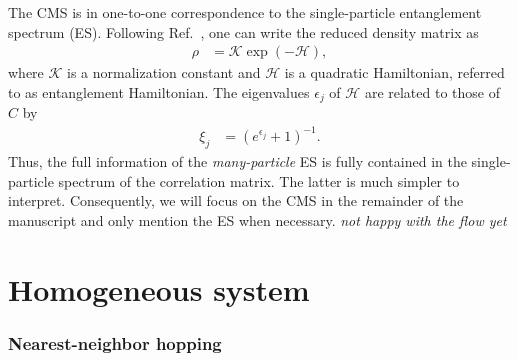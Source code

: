 \documentclass[twocolumn,amsmath,longbibliography,amssymb,superscriptaddress]{revtex4-1}
\newcommand{\mariac}[1]{{\it\color{cyan}#1}}
\begin{document}
The CMS is in one-to-one correspondence to the single-particle entanglement spectrum (ES). 
Following Ref.~\cite{Peschel2008}, one can write the  reduced density matrix as 
\begin{align}\label{eq:red_dens_mat}
\rho&=\mathcal{K} \exp(-\mathcal H),
\end{align}
where $\mathcal{K}$ is a normalization constant and $\mathcal{H}$ is a quadratic Hamiltonian, referred to as entanglement Hamiltonian. 
The eigenvalues $\epsilon_j$ of $\mathcal{H}$ are related to those of $C$ by 
\begin{align}
\xi_j &=\left(e^{\epsilon_j}+1\right)^{-1}. 
\end{align}
Thus, the full information of the \emph{many-particle} ES is fully contained in the single-particle spectrum of the correlation matrix. 
The latter is much simpler to interpret. 
Consequently, we will focus on the CMS in the remainder of the manuscript and only mention the ES when necessary. 
\mariac{not happy with the flow yet}



\section{Homogeneous system}

\subsubsection{Nearest-neighbor hopping}
\end{document}
